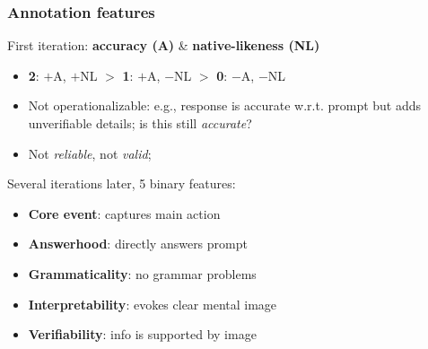 \documentclass[handout,xcolor={dvipsnames}]{beamer}
\begin{document}
\begin{frame}
\frametitle{Annotation features}
\pause
First iteration: \textbf{accuracy (A)} \& \textbf{native-likeness (NL)}
\begin{itemize}
\pause
\item \textbf{2}: $+$A, $+$NL $>$ \textbf{1}: $+$A, $-$NL $>$ \textbf{0}: $-$A, $-$NL
\pause
\item Not operationalizable: e.g., response is accurate w.r.t. prompt but adds unverifiable details; is this still \textit{accurate}?
\item Not \textit{reliable}, not \textit{valid};
\end{itemize}
\pause
\vspace{.6em}
Several iterations later, 5 binary features:
\begin{itemize}
\pause
\item \textbf{Core event}: \pause captures main action
\pause
\item \textbf{Answerhood}: \pause directly answers prompt
\pause
\item \textbf{Grammaticality}: \pause no grammar problems
\pause
\item \textbf{Interpretability}: \pause evokes clear mental image
\pause
\item \textbf{Verifiability}: \pause info is supported by image
\end{itemize}


\end{frame}
\end{document}
